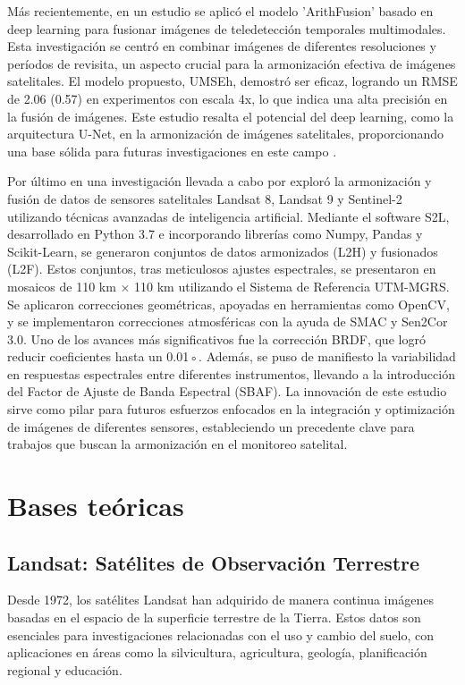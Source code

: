         Más recientemente, en un estudio se aplicó el modelo 'ArithFusion' basado en deep learning para fusionar imágenes de teledetección temporales multimodales. Esta investigación se centró en combinar imágenes de diferentes resoluciones y períodos de revisita, un aspecto crucial para la armonización efectiva de imágenes satelitales. El modelo propuesto, UMSEh, demostró ser eficaz, logrando un RMSE de 2.06 (0.57) en experimentos con escala 4x, lo que indica una alta precisión en la fusión de imágenes. Este estudio resalta el potencial del deep learning, como la arquitectura U-Net, en la armonización de imágenes satelitales, proporcionando una base sólida para futuras investigaciones en este campo \autocite{hoque2022arithfusion}. 
        
        Por último en una investigación llevada a cabo por \textcite{saunier2022sen2like} exploró la armonización y fusión de datos de sensores satelitales Landsat 8, Landsat 9 y Sentinel-2 utilizando técnicas avanzadas de inteligencia artificial. Mediante el software S2L, desarrollado en Python 3.7 e incorporando librerías como Numpy, Pandas y Scikit-Learn, se generaron conjuntos de datos armonizados (L2H) y fusionados (L2F). Estos conjuntos, tras meticulosos ajustes espectrales, se presentaron en mosaicos de 110 km × 110 km utilizando el Sistema de Referencia UTM-MGRS. Se aplicaron correcciones geométricas, apoyadas en herramientas como OpenCV, y se implementaron correcciones atmosféricas con la ayuda de SMAC y Sen2Cor 3.0. Uno de los avances más significativos fue la corrección BRDF, que logró reducir coeficientes hasta un 0.01◦. Además, se puso de manifiesto la variabilidad en respuestas espectrales entre diferentes instrumentos, llevando a la introducción del Factor de Ajuste de Banda Espectral (SBAF). La innovación de este estudio sirve como pilar para futuros esfuerzos enfocados en la integración y optimización de imágenes de diferentes sensores, estableciendo un precedente clave para trabajos que buscan la armonización en el monitoreo satelital.
    \section{Bases teóricas}
        \subsection{Landsat: Satélites de Observación Terrestre}
            Desde 1972, los satélites Landsat han adquirido de manera continua imágenes basadas en el espacio de la superficie terrestre de la Tierra. Estos datos son esenciales para investigaciones relacionadas con el uso y cambio del suelo, con aplicaciones en áreas como la silvicultura, agricultura, geología, planificación regional y educación.
            

